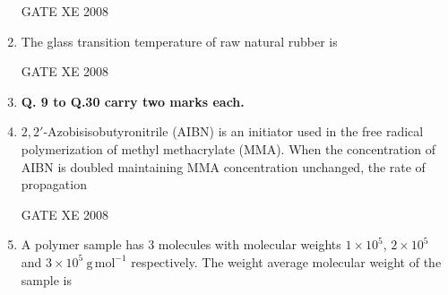 \documentclass[12pt]{article}
\begin{document}
\begin{enumerate}
 GATE XE 2008

\item The glass transition temperature of raw natural rubber is  

\begin{enumerate}
\end{enumerate}

GATE XE 2008

\item[] \textbf{Q. 9 to Q.30 carry two marks each.}


\item $2,2'$-Azobisisobutyronitrile (AIBN) is an initiator used in the free radical polymerization of methyl methacrylate (MMA). When the concentration of AIBN is doubled maintaining MMA concentration unchanged, the rate of propagation  

\begin{enumerate}
\end{enumerate}

GATE XE 2008

\item A polymer sample has $3$ molecules with molecular weights $1\times 10^5$, $2\times 10^5$ and $3\times 10^5~\mathrm{g\,mol^{-1}}$ respectively. The weight average molecular weight of the sample is  

\begin{enumerate}
\end{enumerate}


\end{enumerate}
\end{document}
